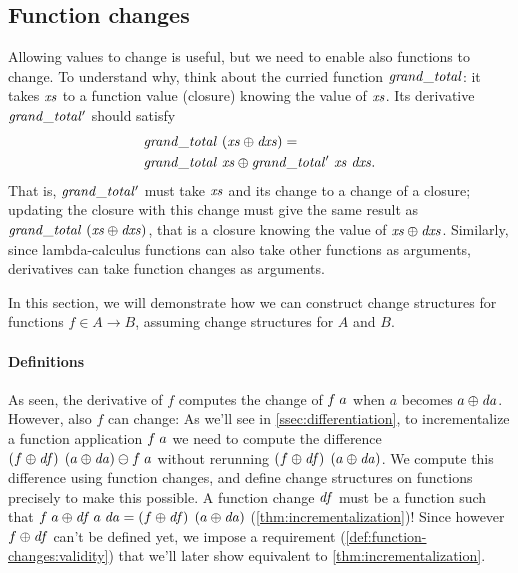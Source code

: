 \subsection{Function changes}
\label{sec:function-change}



Allowing values to change is useful, but we need to enable also functions to change.
To understand why, think about the curried function
$\mathit{grand\_total}$: it takes $\mathit{xs}$ to a function value (closure) knowing the value of $\mathit{xs}$.
Its derivative $\mathit{grand\_total'}$ should satisfy
\begin{align*}
& \Program~(\Xs \UPDATE \DXs) = \\
& \Program~\Xs \UPDATE \Derivative~\Xs~\DXs.
\end{align*}
That is, $\mathit{grand\_total'}$ must take $\mathit{xs}$ and its change to a change
of a closure; updating the closure with this change must give the
same result as $\Program~(\Xs \UPDATE \DXs)$, that is a closure
knowing the value of $\Xs \UPDATE \DXs$.
%
Similarly, since lambda-calculus functions can also take other
functions as arguments, derivatives can take function changes as
arguments.

In this section, we will demonstrate how we can construct change structures
for functions $f \in A
\to B$, assuming change structures for $A$ and $B$.

\paragraph{Definitions}
As seen, the derivative of $f$ computes the change of
$\App f a$ when $a$ becomes $\Upd{a}$. However, also $f$ can
change: As we'll see in \cref{ssec:differentiation},
to incrementalize a function application $f \; a$ we need to compute the difference $\Upd*{f} \APP
\Upd*{a} \DIFF f \APP a$ without rerunning $\Upd*{f} \APP
\Upd*{a}$. We compute this difference using function changes,
and define change structures on functions precisely to make this possible.
A function change $\mathit{df}$ must be a function such that $\Update{\App {f} {a}}{\App{\App{\D f}{a}}{\D a}} = \App
{\Upd*{f}} {\Upd*{a}}$ (\cref{thm:incrementalization})!
Since however $\Upd{f}$ can't be defined yet, we impose a
requirement (\cref{def:function-changes:validity}) that we'll
later show equivalent to \cref{thm:incrementalization}.


